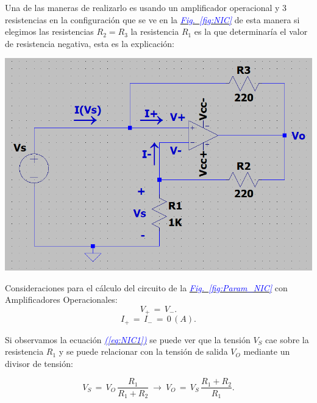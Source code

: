 \documentclass[12pt,a4paper]{report} %
\newcommand{\fref}[1]{\hyperref[#1]{\textcolor{blue}{\textit{Fig.~\ref*{#1}}}}}
\newcommand{\eref}[1]{\hyperref[#1]{\textcolor{blue}{\textit{(\ref*{#1})}}}}
\begin{document}
	\newpage
	
	\noindent Una de las maneras de realizarlo es usando un amplificador operacional y 3 resistencias en la configuración que se ve en la \fref{fig:NIC} de esta manera si elegimos las resistencias $R_2=R_3$ la resistencia $R_1$ es la que determinaría el valor de resistencia negativa, esta es la explicación:
	
	\begin{center}
	\begin{multicols}{2}
		\centering
		\includegraphics[width=\columnwidth]{demotracion_NIC.png}
		\label{fig:Param_NIC}
	
		\columnbreak
		
		Consideraciones para el cálculo del circuito de la \fref{fig:Param_NIC} con Amplificadores Operacionales:\\
		\begin{equation}
			V_+\,=\,V_-.
			\label{eq:NIC1}
		\end{equation}
		\begin{equation}
			I_+\,=\,I_-\,=\,0\,(A).
			\label{eq:NIC2}
		\end{equation}
	\end{multicols}
	\end{center}
	
	Si observamos la ecuación \eref{eq:NIC1} se puede ver que la tensión $V_S$ cae sobre la resistencia $R_1$ y se puede relacionar con la tensión de salida $V_O$ mediante un divisor de tensión:
	
	\begin{equation}
		V_S\,=\,V_O\,\frac{R_1}{R_1 + R_2}\:\longrightarrow\:V_O\,=\,V_S\,\frac{R_1 + R_2}{R_1}.
		\label{eq:NIC3}
	\end{equation}\smallskip
	
\end{document}
